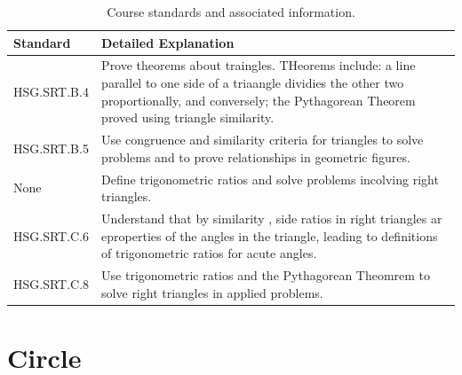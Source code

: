 \documentclass[12pt, oneside]{book}
\begin{document}
\begin{table}[h]
    \centering
    \caption{Course standards and associated information.}
    \vspace{0.3cm} %
    \begin{tabularx}{\textwidth}{l X} %
        \toprule
        \textbf{Standard} & \textbf{Detailed Explanation} \\
        \midrule
        HSG.SRT.B.4 & Prove theorems about traingles. THeorems include: a line parallel to one side of a triaangle dividies the other two proportionally, and conversely; the Pythagorean Theorem proved using triangle similarity. \\
        HSG.SRT.B.5 & Use congruence and similarity criteria for triangles to solve problems and to prove relationships in geometric figures. \\
        None & Define trigonometric ratios and solve problems incolving right triangles. \\
        HSG.SRT.C.6 & Understand that by similarity , side ratios in right triangles ar eproperties of the angles in the triangle, leading to definitions of trigonometric ratios for acute angles. \\
        HSG.SRT.C.8 & Use trigonometric ratios and the Pythagorean Theomrem to solve right triangles in applied problems. \\
        \bottomrule
    \end{tabularx}
\end{table}

\chapter{Circle}
\end{document}
